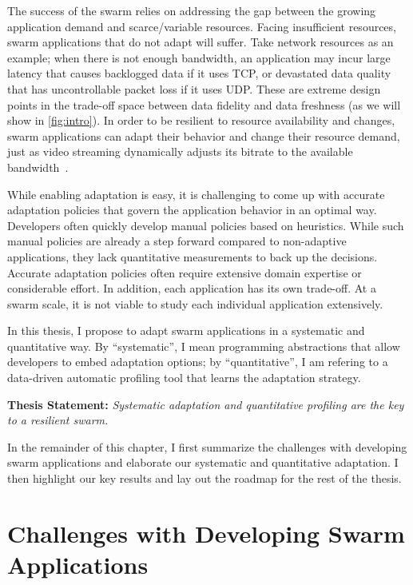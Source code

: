 \documentclass[thesis.tex]{subfiles}
\begin{document}
The success of the swarm relies on addressing the gap between the growing
application demand and scarce/variable resources. Facing insufficient resources,
swarm applications that do not adapt will suffer. Take network resources as an
example; when there is not enough bandwidth, an application may incur large
latency that causes backlogged data if it uses TCP, or devastated data quality
that has uncontrollable packet loss if it uses UDP. These are extreme design
points in the trade-off space between data fidelity and data freshness (as we
will show in \autoref{fig:intro}). In order to be resilient to resource
availability and changes, swarm applications can adapt their behavior and change
their resource demand, just as video streaming dynamically adjusts its bitrate
to the available bandwidth~\cite{michalos2012dynamic}.

While enabling adaptation is easy, it is challenging to come up with accurate
adaptation policies that govern the application behavior in an optimal
way. Developers often quickly develop manual policies based on heuristics. While
such manual policies are already a step forward compared to non-adaptive
applications, they lack quantitative measurements to back up the
decisions. Accurate adaptation policies often require extensive domain expertise
or considerable effort. In addition, each application has its own trade-off. At
a swarm scale, it is not viable to study each individual application
extensively.

In this thesis, I propose to adapt swarm applications in a systematic and
quantitative way. By ``systematic'', I mean programming abstractions that
allow developers to embed adaptation options; by ``quantitative'', I am refering
to a data-driven automatic profiling tool that learns the adaptation strategy.

\vspace{1em}

\noindent\textbf{Thesis Statement:} \textit{Systematic adaptation and
  quantitative profiling are the key to a resilient swarm.}

\vspace{1em}

In the remainder of this chapter, I first summarize the challenges with
developing swarm applications and elaborate our systematic and quantitative
adaptation. I then highlight our key results and lay out the roadmap for the rest
of the thesis.

\section{Challenges with Developing Swarm Applications}
\label{sec:chall-with-exist}
\end{document}
